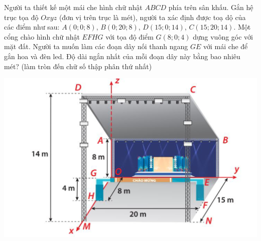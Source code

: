 \begin{ex}%
Người ta thiết kế một mái che hình chữ nhật $ ABCD $ phía trên sân khấu. Gắn hệ trục tọa độ $ Oxyz $ (đơn vị trên trục là mét), người ta xác định được toạ dộ của các điểm như sau: $ A(0;0;8)$, $B(0;20;8)$, $D(15;0;14)$, $C(15;20;14) $. Một cổng chào hình chữ nhật $ EFHG $ với tọa độ điểm $ G(8;0;4) $ dựng vuông góc với mặt đất. Người ta muốn làm các đoạn dây nối thanh ngang $ GE $ với mái che để gắn hoa và đèn led. Độ dài ngắn nhất của mỗi đoạn dây này bằng bao nhiêu mét? (làm tròn đến chữ số thập phân thứ nhất)
\begin{center}
\includegraphics[scale=.7]{images/2P5-1-H5-16}
\end{center}
\end{ex}
